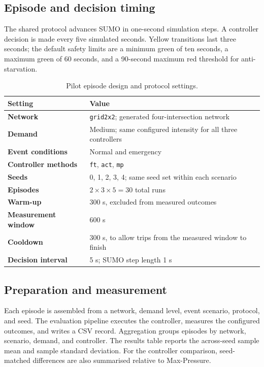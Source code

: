 \documentclass[11pt,a4paper]{article}
\begin{document}
\subsection{Episode and decision timing}
The shared protocol advances SUMO in one-second simulation steps. A controller
decision is made every five simulated seconds. Yellow transitions last three seconds;
the default safety limits are a minimum green of ten seconds, a maximum green of
60 seconds, and a 90-second maximum red threshold for anti-starvation.

\begin{table}[htbp]
\centering\small
\caption{Pilot episode design and protocol settings.}
\begin{tabularx}{\textwidth}{>{\bfseries}p{4.0cm}X}
\toprule
Setting & Value \\
\midrule
Network & \texttt{grid2x2}; generated four-intersection network \\
Demand & Medium; same configured intensity for all three controllers \\
Event conditions & Normal and emergency \\
Controller methods & \texttt{ft}, \texttt{act}, \texttt{mp} \\
Seeds & 0, 1, 2, 3, 4; same seed set within each scenario \\
Episodes & $2 \times 3 \times 5 = 30$ total runs \\
Warm-up & 300 s, excluded from measured outcomes \\
Measurement window & 600 s \\
Cooldown & 300 s, to allow trips from the measured window to finish \\
Decision interval & 5 s; SUMO step length 1 s \\
\bottomrule
\end{tabularx}
\end{table}

\subsection{Preparation and measurement}
Each episode is assembled from a network, demand level, event scenario, protocol, and
seed. The evaluation pipeline executes the controller, measures the configured
outcomes, and writes a CSV record. Aggregation groups episodes by network, scenario,
demand, and controller. The results table reports the across-seed sample mean and
sample standard deviation. For the controller comparison, seed-matched differences
are also summarised relative to Max-Pressure.
\end{document}
